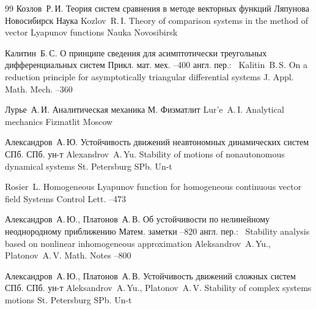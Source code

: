 \begin{thebibliography}{99}
\by Козлов~Р.\,И.
\book Теория систем сравнения в методе векторных
функций Ляпунова
\publaddr Новосибирск
\publ Наука
\misctransl
\by Kozlov~R.\,I. 
\book Theory of comparison systems in the method of vector Lyapunov functions
\publ Nauka
\publaddr Novosibirsk

\by Калитин~Б.\,С.
\paper О принципе сведения для асимптотически
треугольных дифференциальных систем
\jour Прикл. мат. мех.
--400
\transl англ. пер.:~
\by Kalitin~B.\,S. 
\paper On a reduction principle for asymptotically triangular differential systems
\jour J. Appl. Math. Mech.
–360 

\by Лурье~А.\,И.
\book Аналитическая механика
\publaddr М.
\publ Физматлит
\misctransl
\by Lur'e~A.\,I.
\book Analytical mechanics
\publ Fizmatlit
\publaddr Moscow 

\by Александров~А.\,Ю.
\book Устойчивость движений неавтономных динамических систем
\publaddr СПб.
\publ СПб. ун-т
\misctransl 
\by Alexandrov~A.\,Yu.
\book Stability of motions of nonautonomous dynamical systems
\publaddr St. Petersburg
\publ  SPb. Un-t


\by Rosier~L.
\paper Homogeneous Lyapunov function for homogeneous continuous vector field
\jour Systems Control Lett. 
--473

\by Александров~А.\,Ю., Платонов~А.\,В.
\paper Об устойчивости по нелинейному неоднородному приближению
\jour Матем. заметки
--820
\transl \mbox{англ.} пер.:~
\paper Stability analysis based on nonlinear inhomogeneous approximation
\by  Aleksandrov~A.\,Yu., Platonov~A.\,V.
\jour Math. Notes
--800

\by Александров~А.\,Ю., Платонов~А.\,В.
\book Устойчивость движений
сложных систем
\publaddr СПб.
\publ СПб. ун-т
\misctransl
\by Aleksandrov~A.\,Yu., Platonov~A.\,V.
\book Stability of complex systems motions
\publaddr St. Petersburg
\publ  SPb. Un-t



\end{thebibliography}

\noindent
\hskip6.5cm \thedate \par\noindent
\hskip6.5cm\therevdate





\makeengtitlem

\newpage

%
